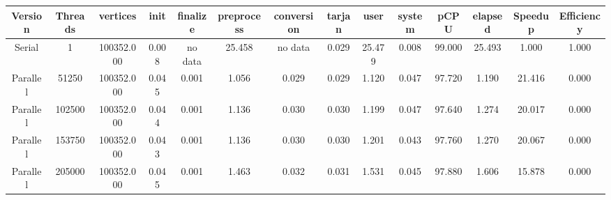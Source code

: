\begin{tabular}{|c|c|c|c|c|c|c|c|c|c|c|c|c|c|}
\toprule
 Version &  Threads &   vertices &  init & finalize &  preprocess & conversion &  tarjan &   user &  system &   pCPU &  elapsed &  Speedup &  Efficiency \\
\midrule
  Serial &        1 & 100352.000 & 0.008 &  no data &      25.458 &    no data &   0.029 & 25.479 &   0.008 & 99.000 &   25.493 &    1.000 &       1.000 \\
Parallel &    51250 & 100352.000 & 0.045 &    0.001 &       1.056 &      0.029 &   0.029 &  1.120 &   0.047 & 97.720 &    1.190 &   21.416 &       0.000 \\
Parallel &   102500 & 100352.000 & 0.044 &    0.001 &       1.136 &      0.030 &   0.030 &  1.199 &   0.047 & 97.640 &    1.274 &   20.017 &       0.000 \\
Parallel &   153750 & 100352.000 & 0.043 &    0.001 &       1.136 &      0.030 &   0.030 &  1.201 &   0.043 & 97.760 &    1.270 &   20.067 &       0.000 \\
Parallel &   205000 & 100352.000 & 0.045 &    0.001 &       1.463 &      0.032 &   0.031 &  1.531 &   0.045 & 97.880 &    1.606 &   15.878 &       0.000 \\
\bottomrule
\end{tabular}
